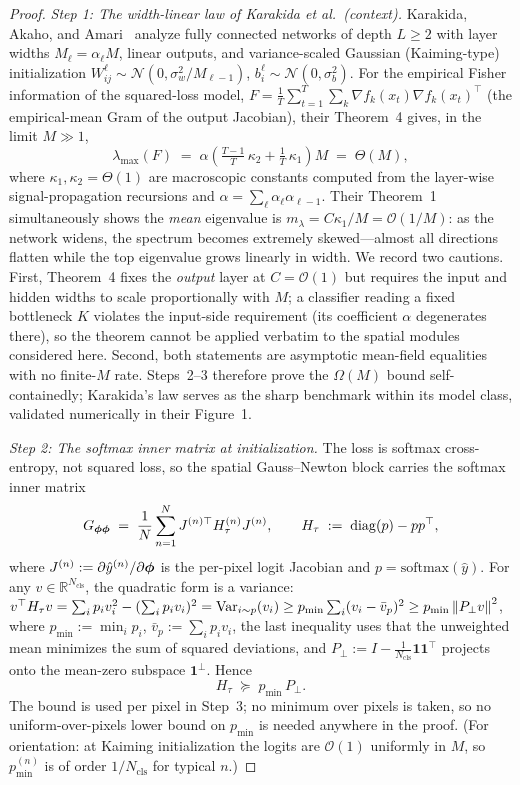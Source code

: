 \begin{proof}
\emph{Step 1: The width-linear law of Karakida et al.\ (context).}
Karakida, Akaho, and Amari~\citep{karakida2019universal} analyze fully
connected networks of depth $L \geq 2$ with layer widths
$M_\ell = \alpha_\ell M$, linear outputs, and variance-scaled Gaussian
(Kaiming-type) initialization
$W^\ell_{ij} \sim \mathcal{N}(0, \sigma_w^2 / M_{\ell-1})$,
$b^\ell_i \sim \mathcal{N}(0, \sigma_b^2)$. For the empirical Fisher
information of the squared-loss model,
$F = \tfrac{1}{T} \sum_{t=1}^{T} \sum_{k} \nabla f_k(x_t) \nabla
f_k(x_t)^\top$ (the empirical-mean Gram of the output Jacobian), their
Theorem~4 gives, in the limit $M \gg 1$,
\[
    \lambda_{\max}(F)
    \;=\; \alpha \left( \tfrac{T-1}{T}\,\kappa_2
        + \tfrac{1}{T}\,\kappa_1 \right) M
    \;=\; \Theta(M),
\]
where $\kappa_1, \kappa_2 = \Theta(1)$ are macroscopic constants computed
from the layer-wise signal-propagation recursions and
$\alpha = \sum_\ell \alpha_\ell \alpha_{\ell - 1}$. Their Theorem~1
simultaneously shows the \emph{mean} eigenvalue is
$m_\lambda = C \kappa_1 / M = \mathcal{O}(1/M)$: as the network widens, the
spectrum becomes extremely skewed---almost all directions flatten while the
top eigenvalue grows linearly in width. We record two cautions. First,
Theorem~4 fixes the \emph{output} layer at $C = \mathcal{O}(1)$ but requires
the input and hidden widths to scale proportionally with $M$; a classifier
reading a fixed bottleneck $K$ violates the input-side requirement (its
coefficient $\alpha$ degenerates there), so the theorem cannot be applied
verbatim to the spatial modules considered here. Second, both statements are
asymptotic mean-field equalities with no finite-$M$ rate. Steps~2--3
therefore prove the $\Omega(M)$ bound self-containedly; Karakida's law
serves as the sharp benchmark within its model class, validated numerically
in their Figure~1.

\emph{Step 2: The softmax inner matrix at initialization.}
The loss is softmax cross-entropy, not squared loss, so the spatial
Gauss--Newton block carries the softmax inner matrix
\[
    G_{{\boldsymbol{\phi}}{\boldsymbol{\phi}}}
    \;=\; \frac{1}{N} \sum_{n=1}^{N}
        J^{(n)\top} H_\tau^{(n)} J^{(n)},
    \qquad
    H_\tau \;:=\; \mathrm{diag}(p) - p p^\top,
\]
where $J^{(n)} := \partial \hat{y}^{(n)} / \partial {\boldsymbol{\phi}}$ is the per-pixel
logit Jacobian and $p = \mathrm{softmax}(\hat{y})$. For any
$v \in \mathbb{R}^{N_{\mathrm{cls}}}$, the quadratic form is a variance:
$v^\top H_\tau v = \sum_i p_i v_i^2 - (\sum_i p_i v_i)^2 =
\mathrm{Var}_{i \sim p}(v_i) \geq p_{\min} \sum_i (v_i - \bar{v}_p)^2
\geq p_{\min} \left\lVert P_\perp v\right\rVert^2$, where $p_{\min} := \min_i p_i$,
$\bar{v}_p := \sum_i p_i v_i$, the last inequality uses that the unweighted
mean minimizes the sum of squared deviations, and
$P_\perp := I - \tfrac{1}{N_{\mathrm{cls}}} \mathbf{1}\mathbf{1}^\top$
projects onto the mean-zero subspace $\mathbf{1}^\perp$. Hence
\[
    H_\tau \;\succeq\; p_{\min} \, P_\perp .
\]
The bound is used per pixel in Step~3; no minimum over pixels is taken, so
no uniform-over-pixels lower bound on $p_{\min}$ is needed anywhere in the
proof. (For orientation: at Kaiming initialization the logits are
$\mathcal{O}(1)$ uniformly in $M$, so $p^{(n)}_{\min}$ is of order
$1/N_{\mathrm{cls}}$ for typical $n$.)


\end{proof}
